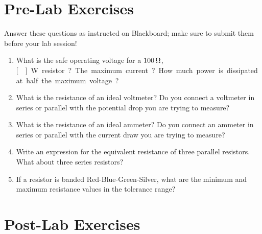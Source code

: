 \documentclass[12pt]{article}
\begin{document}
\newpage

\section*{Pre-Lab Exercises}

Answer these questions as instructed on Blackboard; make sure to
submit them before your lab session!

\begin{enumerate}
\item What is the safe operating voltage for a $\unit[100]{\Omega}$,
  \unit[]{W} resistor?  The maximum current?  How much
  power is dissipated at half the maximum voltage?
\item What is the resistance of an ideal voltmeter?  Do you connect a
  voltmeter in series or parallel with the potential drop you are
  trying to measure?
\item What is the resistance of an ideal ammeter?  Do you connect an
  ammeter in series or parallel with the current draw you are trying
  to measure?
\item Write an expression for the equivalent resistance of three
  parallel resistors.  What about three series resistors?
\item If a resistor is banded Red-Blue-Green-Silver, what are the
  minimum and maximum resistance values in the tolerance range?
\end{enumerate}

\newpage

\section*{Post-Lab Exercises}
\end{document}
